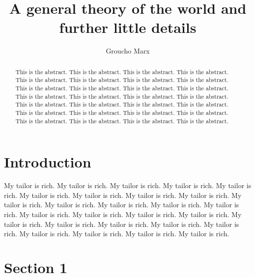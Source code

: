 \documentclass{da2pl2018}
\begin{document}
\title{A general theory of the world and further little details}

\author{Groucho Marx %
}


\maketitle


\begin{abstract}
This is the abstract. This is the abstract. This is the abstract.
This is the abstract. This is the abstract. This is the abstract.
This is the abstract. This is the abstract. This is the abstract.
This is the abstract. This is the abstract. This is the abstract.
This is the abstract. This is the abstract. This is the abstract.
This is the abstract. This is the abstract. This is the abstract.
This is the abstract. This is the abstract. This is the abstract.
This is the abstract. This is the abstract. This is the abstract.
This is the abstract. This is the abstract. This is the abstract.
This is the abstract.
\end{abstract}

\section{Introduction}
\label{intro}


 My tailor is rich. My tailor is rich. My tailor is rich. My tailor is rich. My tailor is rich. My tailor is
 rich. My tailor is rich. My tailor is rich. My tailor is rich. My tailor is rich. My tailor is rich. My tailor is
 rich. My tailor is rich. My tailor is rich. My tailor is rich. My tailor is rich. My tailor is rich. My tailor is rich. My tailor is rich. My tailor is rich. My tailor is
 rich. My tailor is rich. My tailor is rich. My tailor is rich. My tailor is rich. My tailor is rich. My tailor is
 rich.

\section{Section 1}
\label{background}
\end{document}
